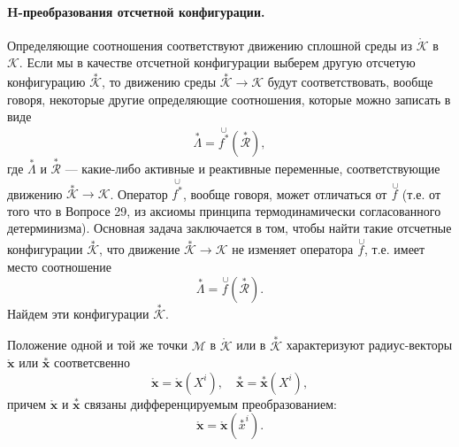 
\paragraph{H-преобразования отсчетной конфигурации.} Определяющие соотношения соответствуют движению сплошной среды из $\mathring{\mathcal{K}}$ в $\mathcal{K}$. Если мы в качестве отсчетной конфигурации выберем другую отсчетую конфигурацию $\overset{\ast}{\mathcal{K}}$, то движению среды $\overset{\ast}{\mathcal{K}} \to \mathcal{K}$ будут соответствовать, вообще говоря, некоторые другие определяющие соотношения, которые можно записать в виде
\begin{equation*}
	\overset{\ast}{\Lambda} = \overset{\cup}{f^{\ast}}(\overset{\ast}{\mathcal{R}}),
\end{equation*} 
где $\overset{\ast}{\Lambda}$ и $\overset{\ast}{\mathcal{R}}$ --- какие-либо активные и реактивные переменные, соответствующие движению $\overset{\ast}{\mathcal{K}} \to \mathcal{K}$. Оператор $\overset{\cup}{f^{\ast}}$, вообще говоря, может отличаться от $\overset{\,\cup}{f}$ (т.е. от того что в Вопросе 29, из аксиомы принципа термодинамически согласованного детерминизма). Основная задача заключается в том, чтобы найти такие отсчетные конфигурации $\overset{\ast}{\mathcal{K}}$, что движение $\overset{\ast}{\mathcal{K}} \to \mathcal{K}$ не изменяет оператора $\overset{\,\cup}{f}$, т.е. имеет место соотношение
\begin{equation*}
	\overset{\ast}{\Lambda} = \overset{\,\cup}{f}(\overset{\ast}{\mathcal{R}}).
\end{equation*}
Найдем эти конфигурации $\overset{\ast}{\mathcal{K}}$.

Положение одной и той же точки $\mathcal{M}$ в $\mathring{\mathcal{K}}$ или в $\overset{\ast}{\mathcal{K}}$ характеризуют радиус-векторы $\mathring{\mathbf{x}}$ или $\overset{\ast}{\mathbf{x}}$ соответсвенно
\begin{equation*}
	\mathring{\mathbf{x}} = \mathring{\mathbf{x}}(X^i), \quad 
	\overset{\ast}{\mathbf{x}} = \overset{\ast}{\mathbf{x}}(X^i),
\end{equation*}
причем $\mathring{\mathbf{x}}$ и $\overset{\ast}{\mathbf{x}}$ связаны дифференцируемым преобразованием:
\begin{equation*}
	\mathring{\mathbf{x}} = \mathring{\mathbf{x}}(\overset{\ast}{x}^i). 
\end{equation*}

